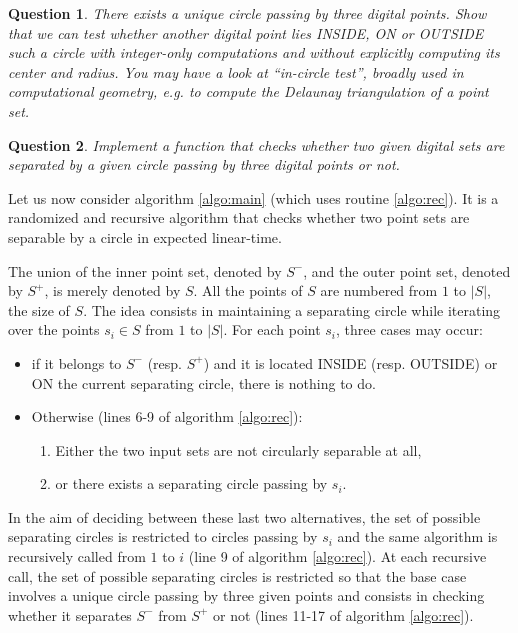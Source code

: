 \documentclass[a4paper, 11pt]{article}
\newtheorem{qu}{Question}
\begin{document}
\begin{qu}
There exists a unique circle passing by three digital points. Show that we can test whether another digital
point lies INSIDE, ON or OUTSIDE such a circle with integer-only computations and without explicitly computing 
its center and radius. You may have a look at ``in-circle test'', broadly used in computational geometry, e.g. 
to compute the Delaunay triangulation of a point set.  
\end{qu}

\begin{qu}
Implement a function that checks whether two given digital sets are separated by a given circle passing by three
digital points or not.  
\end{qu}

Let us now consider algorithm \ref{algo:main} (which uses routine \ref{algo:rec}). 
It is a randomized and recursive algorithm that checks whether two point sets
 are separable by a circle in expected linear-time. 

The union of the inner point set, denoted by $S^-$, and the outer point set, denoted by $S^+$, is 
merely denoted by $S$. All the points of $S$ are numbered from $1$ to $|S|$, the size of $S$.    
The idea consists in maintaining a separating circle while iterating over the points $s_i \in S$ from $1$ to $|S|$. 
For each point $s_i$, three cases may occur:  
\begin{itemize}
 \item if it belongs to $S^-$ (resp. $S^+$) and it is located INSIDE (resp. OUTSIDE) or ON 
the current separating circle, there is nothing to do. 
 \item Otherwise (lines 6-9 of algorithm \ref{algo:rec}): 
 \begin{enumerate}
   \item Either the two input sets are not circularly separable at all,  
   \item or there exists a separating circle passing by $s_i$. 
 \end{enumerate}
\end{itemize}
In the aim of deciding between these last two alternatives, the set of possible separating 
circles is restricted to circles passing by $s_i$ and the same algorithm is recursively called
from $1$ to $i$ (line 9 of algorithm \ref{algo:rec}). 
At each recursive call, the set of possible separating circles is restricted so that the base case 
involves a unique circle passing by three given points and consists in checking whether it separates 
$S^-$ from $S^+$ or not (lines 11-17 of algorithm \ref{algo:rec}).  
\end{document}
